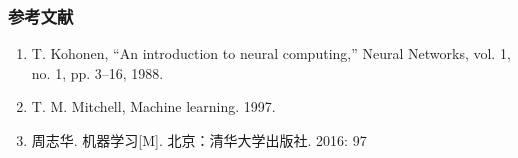 \subsubsection{参考文献}
\begin{enumerate}
\item T. Kohonen, “An introduction to neural computing,” Neural Networks, vol. 1, no. 1, pp. 3–16, 1988.
\item T. M. Mitchell, Machine learning. 1997.
\item 周志华. 机器学习[M]. 北京：清华大学出版社. 2016: 97
\end{enumerate}